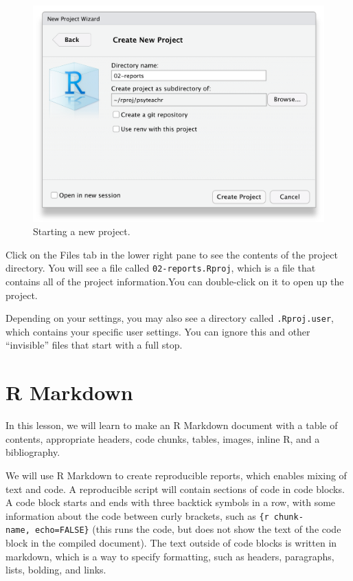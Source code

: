\documentclass[
  oneside]{book}
\begin{document}
\begin{figure}

{\centering \includegraphics[width=1\linewidth]{images/repro/new_proj_3} 

}

\caption{Starting a new project.}\label{fig:unnamed-chunk-2-3}
\end{figure}

Click on the Files tab in the lower right pane to see the contents of the project directory. You will see a file called \texttt{02-reports.Rproj}, which is a file that contains all of the project information.You can double-click on it to open up the project.

\begin{info}
Depending on your settings, you may also see a directory called \texttt{.Rproj.user}, which contains your specific user settings. You can ignore this and other ``invisible'' files that start with a full stop.

\end{info}

\hypertarget{r-markdown}{%
\section{R Markdown}\label{r-markdown}}

In this lesson, we will learn to make an R Markdown document with a table of contents, appropriate headers, code chunks, tables, images, inline R, and a bibliography.

We will use R Markdown to create reproducible reports, which enables mixing of text and code. A reproducible script will contain sections of code in code blocks. A code block starts and ends with three backtick symbols in a row, with some information about the code between curly brackets, such as \texttt{\{r\ chunk-name,\ echo=FALSE\}} (this runs the code, but does not show the text of the code block in the compiled document). The text outside of code blocks is written in markdown, which is a way to specify formatting, such as headers, paragraphs, lists, bolding, and links.
\end{document}
